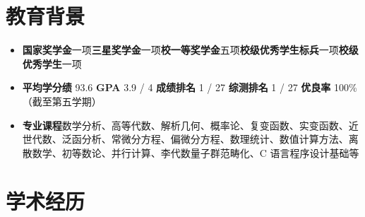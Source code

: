 \documentclass{resume}
\begin{document}




\sepspace
{}


\section{教育背景}
\begin{itemize}
  \item \textbf{国家奖学金}一项\quad\textbf{三星奖学金}一项\quad\textbf{校一等奖学金}五项\quad\textbf{校级优秀学生标兵}一项\quad\textbf{校级优秀学生}一项
  \item \textbf{平均学分绩} 93.6 \quad\textbf{GPA} 3.9 / 4 \quad\textbf{成绩排名} 1 / 27 \quad\textbf{综测排名} 1 / 27 \quad \textbf{优良率} 100\% \quad（截至第五学期）
  \item \textbf{专业课程}\quad 数学分析、高等代数、解析几何、概率论、复变函数、实变函数、近世代数、泛函分析、常微分方程、偏微分方程、数理统计、数值计算方法、离散数学、初等数论、并行计算、李代数量子群范畴化、C 语言程序设计基础等
\end{itemize}

\section{学术经历}
\end{document}
